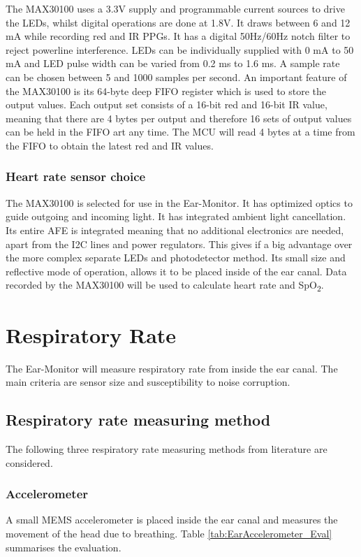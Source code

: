 The MAX30100 uses a 3.3V supply and programmable current sources to drive the LEDs, whilst digital operations are done at 1.8V. It draws between 6 and 12 mA while recording red and IR PPGs. It has a digital 50Hz/60Hz notch filter to reject powerline interference. LEDs can be individually supplied with 0 mA to 50 mA and LED pulse width can be varied from 0.2 ms to 1.6 ms. A sample rate can be chosen between 5 and 1000 samples per second. An important feature of the MAX30100 is its 64-byte deep FIFO register which is used to store the output values. Each output set consists of a 16-bit red and 16-bit IR value, meaning that there are 4 bytes per output and therefore 16 sets of output values can be held in the FIFO art any time. The MCU will read 4 bytes at a time from the FIFO to obtain the latest red and IR values.

\subsubsection{Heart rate sensor choice}
The MAX30100 is selected for use in the Ear-Monitor. It has optimized optics to guide outgoing and incoming light. It has integrated ambient light cancellation. Its entire AFE is integrated meaning that no additional electronics are needed, apart from the I2C lines and power regulators. This gives if a big advantage over the more complex separate LEDs and photodetector method. Its small size and reflective mode of operation, allows it to be placed inside of the ear canal. Data recorded by the MAX30100 will be used to calculate heart rate and SpO\textsubscript{2}. 

\section{Respiratory Rate}
The Ear-Monitor will measure respiratory rate from inside the ear canal. The main criteria are sensor size and susceptibility to noise corruption.

\subsection{Respiratory rate measuring method}
The following three respiratory rate measuring methods from literature are considered.

\subsubsection{Accelerometer}
A small MEMS accelerometer is placed inside the ear canal and measures the movement of the head due to breathing. Table \ref{tab:EarAccelerometer_Eval} summarises the evaluation.

